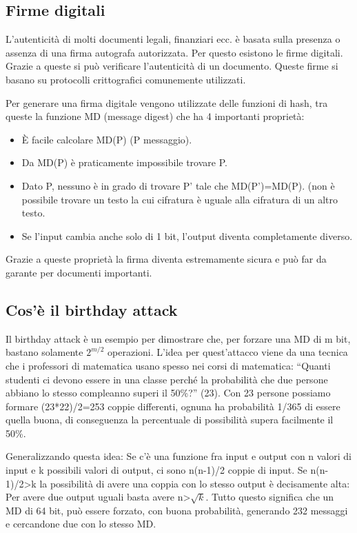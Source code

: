 \subsection{Firme digitali}
L’autenticità di molti documenti legali, finanziari ecc. è basata sulla presenza o assenza di una firma autografa autorizzata. Per questo esistono le firme digitali. Grazie a queste si può verificare l’autenticità di un documento. Queste firme si basano su protocolli crittografici comunemente utilizzati.

Per generare una firma digitale vengono utilizzate delle funzioni di hash, tra queste la funzione MD (message digest) che ha 4 importanti proprietà:
\begin{itemize}
\item	È facile calcolare MD(P) (P messaggio).
\item	Da MD(P) è praticamente impossibile trovare P.
\item	Dato P, nessuno è in grado di trovare P’ tale che MD(P’)=MD(P). (non è possibile trovare un testo la cui cifratura è uguale alla cifratura di un altro testo.
\item	Se l’input cambia anche solo di 1 bit, l’output diventa completamente diverso.
\end{itemize}
Grazie a queste proprietà la firma diventa estremamente sicura e può far da garante per documenti importanti.
\subsection{Cos'è il birthday attack}
Il birthday attack è un esempio per dimostrare che, per forzare una MD di m bit, bastano solamente $2^{m/2}$ operazioni. L’idea per quest’attacco viene da una tecnica che i professori di matematica usano spesso nei corsi di matematica: “Quanti studenti ci devono essere in una classe perché la probabilità che due persone abbiano lo stesso compleanno superi il 50\%?” (23).
Con 23 persone possiamo formare (23*22)/2=253 coppie differenti, ognuna ha probabilità 1/365 di essere quella buona, di conseguenza la percentuale di possibilità supera facilmente il 50\%.

Generalizzando questa idea: Se c’è una funzione fra input e output con n valori di input e k possibili valori di output, ci sono n(n-1)/2 coppie di input. Se n(n-1)/2>k la possibilità di avere una coppia con lo stesso output è decisamente alta: Per avere due output uguali basta avere n>$\sqrt{k}$.
Tutto questo significa che un MD di 64 bit, può essere forzato, con buona probabilità, generando 232 messaggi e cercandone due con lo stesso MD.

